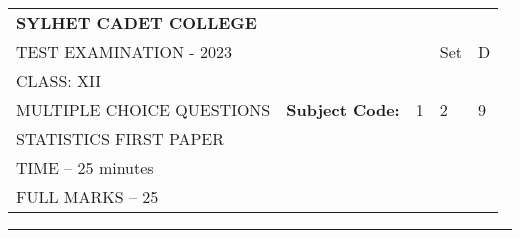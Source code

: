 \documentclass{exam}
\begin{document}
\begin{table}[h]
\centering
\begin{tabular}{lllll}
\textbf{\large SYLHET CADET COLLEGE} &  &  &  &  \\ \cline{4-5} 
TEST EXAMINATION - 2023 &  & \multicolumn{1}{l|}{} & \multicolumn{1}{l|}{Set} & \multicolumn{1}{l|}{D} \\ \cline{4-5} 
CLASS: XII &  &  &  &  \\ \cline{3-5} 
MULTIPLE CHOICE QUESTIONS & \multicolumn{1}{l|}{\textbf{Subject Code:}} & \multicolumn{1}{l|}{1} & \multicolumn{1}{l|}{2} & \multicolumn{1}{l|}{9} \\ \cline{3-5} 
STATISTICS FIRST PAPER &  &  &  &  \\
TIME – 25 minutes &  &  &  &  \\
FULL MARKS – 25 &  &  &  & 
\end{tabular}
\end{table}
\hrule
\end{document}
